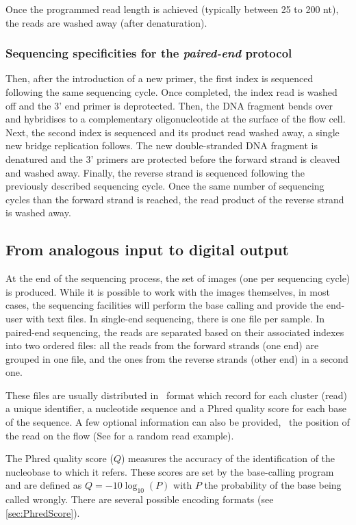 Once the programmed read length is achieved (typically between 25 to 200 \gls{nt}),
the reads are washed away (after denaturation).

\subsubsection{Sequencing specificities for the \emph{paired-end} protocol}

Then, after the introduction of a new primer, the first index is sequenced
following the same sequencing cycle.
Once completed, the index read is washed off and the 3' end primer is deprotected.
Then, the \gls{DNA} fragment bends over and hybridises to a complementary
oligonucleotide at the surface of the flow cell.
Next, the second index is sequenced and its product read washed away,
a single new bridge replication follows.
The new double-stranded \gls{DNA} fragment is denatured and the 3' primers are
protected before the forward strand is cleaved and washed away.
Finally, the reverse strand is sequenced following the previously described
sequencing cycle. Once the same number of sequencing cycles than the forward
strand is reached, the read product of the reverse strand is washed away.

\subsection{From analogous input to digital output}

At the end of the sequencing process, the set of images (one per sequencing cycle)
is produced. While it is possible to work with the images themselves, in most
cases, the sequencing facilities will perform the base calling and provide the
end-user with text files. In single-end sequencing, there is one file per sample.
In paired-end sequencing, the reads are separated based on their associated
indexes into two ordered files: all the reads from the forward strands (one end)
are grouped in one file, and the ones from the reverse strands (other end)
in a second one.

These files are usually distributed in \fastq\ format
 which record for each cluster (read) a unique identifier,
a nucleotide sequence and a \gls{Phred} quality score for each base of the
sequence. A few optional information can also be provided, \eg\
the position of the read on the \gls{flow} (See  for
a random read example).

The \gls{Phred} quality score ($Q$) measures the accuracy of the identification
of the nucleobase to which it refers. These scores are set by the base-calling
program and are defined as $Q = -10\log_{10}(P)$ with $P$ the probability of
the base being called wrongly. There are several possible encoding formats
(see \cref{sec:PhredScore}).

